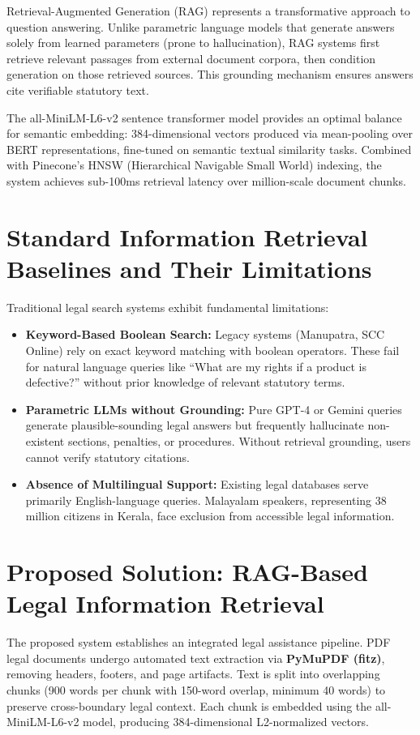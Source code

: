 \documentclass[12pt,a4paper]{report}
\begin{document}
Retrieval-Augmented Generation (RAG) represents a transformative approach to question answering. Unlike parametric language models that generate answers solely from learned parameters (prone to hallucination), RAG systems first retrieve relevant passages from external document corpora, then condition generation on those retrieved sources. This grounding mechanism ensures answers cite verifiable statutory text.

The all-MiniLM-L6-v2 sentence transformer model provides an optimal balance for semantic embedding: 384-dimensional vectors produced via mean-pooling over BERT representations, fine-tuned on semantic textual similarity tasks. Combined with Pinecone's HNSW (Hierarchical Navigable Small World) indexing, the system achieves sub-100ms retrieval latency over million-scale document chunks.

\section{Standard Information Retrieval Baselines and Their Limitations}
Traditional legal search systems exhibit fundamental limitations:
\begin{itemize}
    \item \textbf{Keyword-Based Boolean Search:} Legacy systems (Manupatra, SCC Online) rely on exact keyword matching with boolean operators. These fail for natural language queries like ``What are my rights if a product is defective?'' without prior knowledge of relevant statutory terms.
    \item \textbf{Parametric LLMs without Grounding:} Pure GPT-4 or Gemini queries generate plausible-sounding legal answers but frequently hallucinate non-existent sections, penalties, or procedures. Without retrieval grounding, users cannot verify statutory citations.
    \item \textbf{Absence of Multilingual Support:} Existing legal databases serve primarily English-language queries. Malayalam speakers, representing 38 million citizens in Kerala, face exclusion from accessible legal information.
\end{itemize}

\section{Proposed Solution: RAG-Based Legal Information Retrieval}
The proposed system establishes an integrated legal assistance pipeline. PDF legal documents undergo automated text extraction via \textbf{PyMuPDF (fitz)}, removing headers, footers, and page artifacts. Text is split into overlapping chunks (900 words per chunk with 150-word overlap, minimum 40 words) to preserve cross-boundary legal context. Each chunk is embedded using the all-MiniLM-L6-v2 model, producing 384-dimensional L2-normalized vectors.
\end{document}

